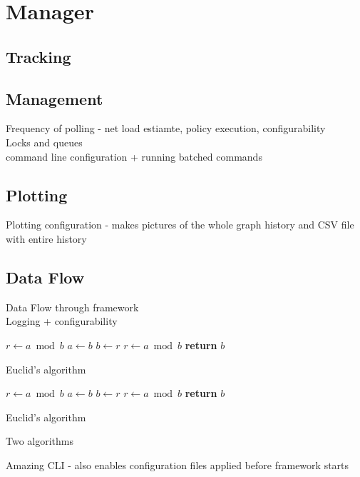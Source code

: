\documentclass{l4proj}
\begin{document}
\section{Manager}
\subsection{Tracking}

\subsection{Management}
Frequency of polling - net load estiamte, policy execution, configurability
\\Locks and queues
\\command line configuration + running batched commands
\subsection{Plotting}
Plotting configuration - makes pictures of the whole graph history and CSV file with entire history
\subsection{Data Flow}
Data Flow through framework
\\Logging + configurability
\begin{table}[H]%
\begin{subalgorithm}{.5\textwidth}
\begin{algorithmic}[1]
    \State $r\gets a\bmod b$
      \State $a\gets b$
      \State $b\gets r$
      \State $r\gets a\bmod b$
    \EndWhile
    \State \textbf{return} $b$
  \EndProcedure
\end{algorithmic}
\caption{Euclid’s algorithm}\label{algo1}
\end{subalgorithm}%
\begin{subalgorithm}{.5\textwidth}
\begin{algorithmic}[1]
    \State $r\gets a\bmod b$
      \State $a\gets b$
      \State $b\gets r$
      \State $r\gets a\bmod b$
    \EndWhile
    \State \textbf{return} $b$
  \EndProcedure
\end{algorithmic}
\caption{Euclid’s algorithm}\label{algo2}
\end{subalgorithm}
\captionsetup{labelformat=alglabel}
\caption{Two algorithms}%
\label{tab:1}%
\end{table}
Amazing CLI - also enables configuration files applied before framework starts
\end{document}
